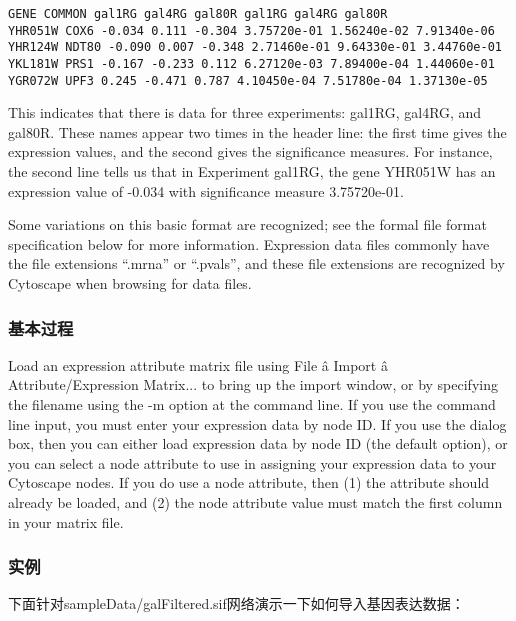  \begin{verbatim}
GENE COMMON gal1RG gal4RG gal80R gal1RG gal4RG gal80R
YHR051W COX6 -0.034 0.111 -0.304 3.75720e-01 1.56240e-02 7.91340e-06
YHR124W NDT80 -0.090 0.007 -0.348 2.71460e-01 9.64330e-01 3.44760e-01
YKL181W PRS1 -0.167 -0.233 0.112 6.27120e-03 7.89400e-04 1.44060e-01
YGR072W UPF3 0.245 -0.471 0.787 4.10450e-04 7.51780e-04 1.37130e-05
\end{verbatim}

 This indicates that there is data for three experiments: gal1RG, gal4RG, and gal80R. These names appear two times in the header line: the first time gives the expression values, and the second gives the significance measures. For instance, the second line tells us that in Experiment gal1RG, the gene YHR051W has an expression value of -0.034 with significance measure 3.75720e-01. 

 Some variations on this basic format are recognized; see the formal file format specification below for more information. Expression data files commonly have the file extensions ``.mrna'' or ``.pvals'', and these file extensions are recognized by Cytoscape when browsing for data files. 
 
\subsubsection{基本过程}
 Load an expression attribute matrix file using File \^a Import \^a Attribute/Expression Matrix... to bring up the import window, or by specifying the filename using the -m option at the command line. If you use the command line input, you must enter your expression data by node ID. If you use the dialog box, then you can either load expression data by node ID (the default option), or you can select a node attribute to use in assigning your expression data to your Cytoscape nodes. If you do use a node attribute, then (1) the attribute should already be loaded, and (2) the node attribute value must match the first column in your matrix file. 
 
\subsubsection{实例}
下面针对sampleData/galFiltered.sif网络演示一下如何导入基因表达数据： 

